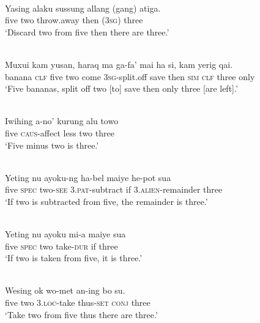 \ea%
\label{bkm:Ref358042906}
\\
\gll  Yasing  alaku  sussung  allang  (gang)  atiga.  \\  
   five  two  throw.away  then  (\textsc{3sg) } three  \\
\glt `Discard two from five then there are three.'
\z

 

\ea
\label{ex:8:1240}
\\
 \gll Muxui  kam  yusan,     haraq  ma  ga-fa'   mai   ha  si,  kam  yerig   qai.      \\
    banana  \textsc{clf}  five   two  come  \textsc{3sg-}split.off  save  then  \textsc{sim}  \textsc{clf} three  only    \\
 \glt `Five bananas,    split off two [to] save then only three [are left].' 
\z
 
\ea
\label{ex:8:1241}
\\ 
\gll Iwihing  a-no'   kurung  alu  towo\\
 five  \textsc{caus}{}-affect  less  two  three\\
\glt `Five minus two is three.' 
\z  


\ea
\label{ex:8:1242}
\\
 \gll Yeting  nu  ayoku-ng  ha-bel  maiye  he-pot  sua\\
  five  \textsc{spec}   two-\textsc{see } 3.\textsc{pat}{}-subtract  if  \textsc{3.alien}{}-remainder  three \\
 \glt `If two is subtracted from five, the remainder is three.' 
\z 
  
\ea
\label{ex:8:1243}
\\
 \gll Yeting  nu  ayoku  mi-a  maiye  sua\\
  five  \textsc{spec } two  take-\textsc{dur } if  three   \\
 \glt `If two is taken from five, it is three.' 
\z
 
  

\ea%
\label{bkm:Ref358115306}
  
\\
\gll  Wesing  ok  wo-met  an-ing  bo  su.   \\  
    five  two   3.\textsc{loc-}take  thus\textsc{{}-set}  \textsc{conj} three   \\
\glt `Take two from five thus there are three.' 
\z



